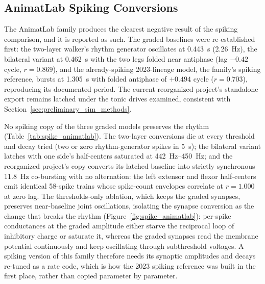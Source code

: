 \subsection{AnimatLab Spiking Conversions}

The AnimatLab family produces the clearest negative result of the spiking comparison, and it is reported as such. The graded baselines were re-established first: the two-layer walker's rhythm generator oscillates at \qty{0.443}{\second} (\qty{2.26}{\hertz}), the bilateral variant at \qty{0.462}{\second} with the two legs folded near antiphase (lag $-0.42$ cycle, $r = 0.869$), and the already-spiking 2023-lineage model, the family's spiking reference, bursts at \qty{1.305}{\second} with folded antiphase of $+0.494$ cycle ($r = 0.703$), reproducing its documented period. The current reorganized project's standalone export remains latched under the tonic drives examined, consistent with Section~\ref{sec:preliminary_sim_methods}.

No spiking copy of the three graded models preserves the rhythm (Table~\ref{tab:spike_animatlab}). The two-layer conversions die at every threshold and decay tried (two or zero rhythm-generator spikes in \qty{5}{\second}); the bilateral variant latches with one side's half-centers saturated at \qty{442}{\hertz}--\qty{450}{\hertz}; and the reorganized project's copy converts its latched baseline into strictly synchronous \qty{11.8}{\hertz} co-bursting with no alternation: the left extensor and flexor half-centers emit identical 58-spike trains whose spike-count envelopes correlate at $r = 1.000$ at zero lag. The thresholds-only ablation, which keeps the graded synapses, preserves near-baseline joint oscillations, isolating the synapse conversion as the change that breaks the rhythm (Figure~\ref{fig:spike_animatlab}): per-spike conductances at the graded amplitude either starve the reciprocal loop of inhibitory charge or saturate it, whereas the graded synapses read the membrane potential continuously and keep oscillating through subthreshold voltages. A spiking version of this family therefore needs its synaptic amplitudes and decays re-tuned as a rate code, which is how the 2023 spiking reference was built in the first place, rather than copied parameter by parameter.

